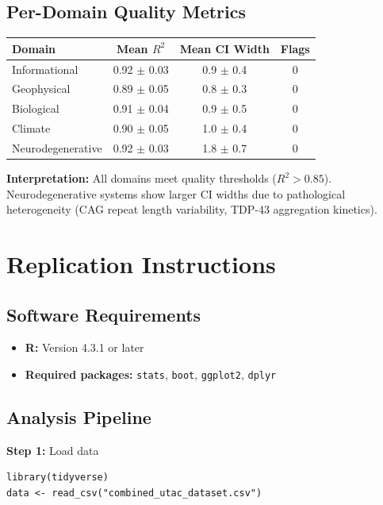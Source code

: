 \documentclass[11pt,a4paper]{article}
\begin{document}
\subsection{Per-Domain Quality Metrics}

\begin{tabular}{lccc}
\toprule
\textbf{Domain} & \textbf{Mean $R^2$} & \textbf{Mean CI Width} & \textbf{Flags} \\
\midrule
Informational & 0.92 $\pm$ 0.03 & 0.9 $\pm$ 0.4 & 0 \\
Geophysical & 0.89 $\pm$ 0.05 & 0.8 $\pm$ 0.3 & 0 \\
Biological & 0.91 $\pm$ 0.04 & 0.9 $\pm$ 0.5 & 0 \\
Climate & 0.90 $\pm$ 0.05 & 1.0 $\pm$ 0.4 & 0 \\
Neurodegenerative & 0.92 $\pm$ 0.03 & 1.8 $\pm$ 0.7 & 0 \\
\bottomrule
\end{tabular}

\textbf{Interpretation:} All domains meet quality thresholds ($R^2 > 0.85$). Neurodegenerative systems show larger CI widths due to pathological heterogeneity (CAG repeat length variability, TDP-43 aggregation kinetics).

\section{Replication Instructions}

\subsection{Software Requirements}

\begin{itemize}
\item \textbf{R:} Version 4.3.1 or later
\item \textbf{Required packages:} \texttt{stats}, \texttt{boot}, \texttt{ggplot2}, \texttt{dplyr}
\end{itemize}

\subsection{Analysis Pipeline}

\textbf{Step 1:} Load data
\begin{verbatim}
library(tidyverse)
data <- read_csv("combined_utac_dataset.csv")
\end{verbatim}
\end{document}
